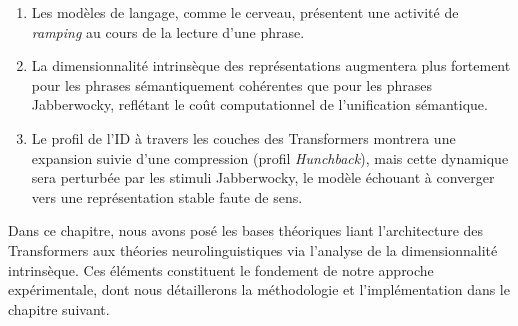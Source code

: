 \begin{enumerate}
    \item Les modèles de langage, comme le cerveau, présentent une activité de \textit{ramping} au cours de la lecture d'une phrase.
    \item La dimensionnalité intrinsèque des représentations augmentera plus fortement pour les phrases sémantiquement cohérentes que pour les phrases Jabberwocky, reflétant le coût computationnel de l'unification sémantique.
    \item Le profil de l'ID à travers les couches des Transformers montrera une expansion suivie d'une compression (profil \textit{Hunchback}), mais cette dynamique sera perturbée par les stimuli Jabberwocky, le modèle échouant à converger vers une représentation stable faute de sens.
\end{enumerate}

Dans ce chapitre, nous avons posé les bases théoriques liant l'architecture des Transformers aux théories neurolinguistiques via l'analyse de la dimensionnalité intrinsèque. Ces éléments constituent le fondement de notre approche expérimentale, dont nous détaillerons la méthodologie et l'implémentation dans le chapitre suivant.